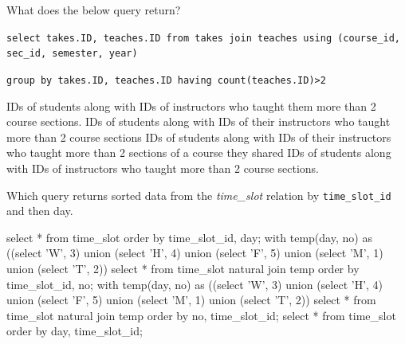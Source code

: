 \documentclass[12pt, addpoints]{exam}
\begin{document}
\begin{questions}
\begin{minipage}{\linewidth}
\begin{checkboxes}
\end{checkboxes}
\end{minipage}\vspace{1em}

\begin{minipage}{\linewidth}
\question[2]
What does the below query return?\par\vspace{0.5em}

\texttt{select takes.ID, teaches.ID from takes join teaches using (course\_id, sec\_id, semester, year)}\par
\texttt{group by takes.ID, teaches.ID having count(teaches.ID)>2}\par\vspace{0.5em}

\begin{checkboxes}
    \CorrectChoice IDs of students along with IDs of instructors who taught them more than 2 course sections.
    \choice IDs of students along with IDs of their instructors who taught more than 2 course sections
    \choice IDs of students along with IDs of their instructors who taught more than 2 sections of a course they shared
    \choice IDs of students along with IDs of instructors who taught more than 2 course sections.
\end{checkboxes}
\end{minipage}\vspace{1em}

\begin{minipage}{\linewidth}
\question[4]
Which query returns sorted data from the \textit{time\_slot} relation by \texttt{time\_slot\_id} and then day.\par\vspace{0.5em}

\begin{checkboxes}
    \choice select * from time\_slot order by time\_slot\_id, day;
    \CorrectChoice with temp(day, no) as ((select 'W', 3) union (select 'H', 4) union (select 'F', 5) union
(select 'M', 1) union (select 'T', 2)) select * from time\_slot natural join temp order by time\_slot\_id, no;
    \choice with temp(day, no) as ((select 'W', 3) union (select 'H', 4) union
(select 'F', 5) union (select 'M', 1) union (select 'T', 2))
select * from time\_slot natural join temp order by no, time\_slot\_id;
    \choice select * from time\_slot order by day, time\_slot\_id;
\end{checkboxes}
\end{minipage}\vspace{1em}


\end{questions}
\end{document}
